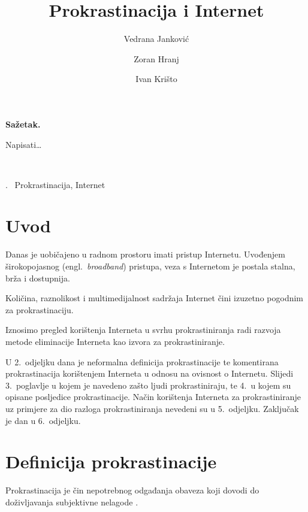 \documentclass[11pt,twocolumn,english]{article}
\let\LaTeXtitle\title
\renewcommand{\title}[1]{\LaTeXtitle{\Large \textbf{#1}}}
\renewenvironment{abstract}
{\noindent \large \bf Sažetak.\normalsize\begin{it}}
{\end{it}\\}
\newenvironment{keywords}
{\noindent {\large {\bf Ključne riječi}}.~}{}
\newcommand{\engl}[1]{(engl.~\emph{#1})}
\begin{document}
\title{Prokrastinacija i Internet}
\author{Vedrana Janković}
\author{Zoran Hranj}
\author{Ivan Krišto}

\date{}

\maketitle
\thispagestyle{empty}
\pagestyle{empty}

\begin{abstract}
Napisati\ldots
\end{abstract}

\begin{keywords}
Prokrastinacija, Internet
\end{keywords}

\section{Uvod}
Danas je uobičajeno u radnom prostoru imati pristup Internetu. Uvođenjem
širokopojasnog \engl{broadband} pristupa, veza s Internetom je postala stalna,
brža i dostupnija.

Količina, raznolikost i multimedijalnost sadržaja Internet čini izuzetno
pogodnim za prokrastinaciju.

Iznosimo pregled korištenja Interneta u svrhu prokrastiniranja radi razvoja
metode eliminacije Interneta kao izvora za prokrastiniranje.

U 2.~odjeljku dana je neformalna definicija prokrastinacije te komentirana
prokrastinacija korištenjem Interneta u odnosu na ovisnost o Internetu. Slijedi
3.~poglavlje u kojem je navedeno zašto ljudi prokrastiniraju, te 4.~u kojem su
opisane posljedice prokrastinacije. Način korištenja Interneta za
prokrastiniranje uz primjere za dio razloga prokrastiniranja nevedeni su u
5.~odjeljku. Zaključak je dan u 6.~odjeljku.

\section{Definicija prokrastinacije}
Prokrastinacija je čin nepotrebnog odgađanja obaveza koji dovodi do 
doživljavanja subjektivne nelagode \cite{solomon1984academic}.


\end{document}
